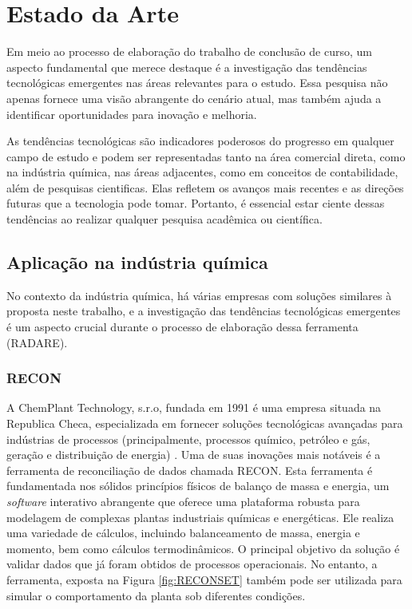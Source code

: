 \section{Estado da Arte}

Em meio ao processo de elaboração do trabalho de conclusão de curso, um aspecto fundamental que merece destaque é a investigação das tendências tecnológicas emergentes nas áreas relevantes para o estudo. Essa pesquisa não apenas fornece uma visão abrangente do cenário atual, mas também ajuda a identificar oportunidades para inovação e melhoria.

As tendências tecnológicas são indicadores poderosos do progresso em qualquer campo de estudo e podem ser representadas tanto na área comercial direta, como na indústria química, nas áreas adjacentes, como em conceitos de contabilidade, além de pesquisas cientificas. Elas refletem os avanços mais recentes e as direções futuras que a tecnologia pode tomar. Portanto, é essencial estar ciente dessas tendências ao realizar qualquer pesquisa acadêmica ou científica.

\subsection{Aplicação na indústria química}

No contexto da indústria química, há várias empresas com soluções similares à proposta neste trabalho, e a investigação das tendências tecnológicas emergentes é um aspecto crucial durante o processo de elaboração dessa ferramenta (RADARE). 

\subsubsection{RECON}

A ChemPlant Technology, s.r.o, fundada em 1991 é uma empresa situada na Republica Checa, especializada em fornecer soluções tecnológicas avançadas para indústrias de processos (principalmente, processos químico, petróleo e gás, geração e distribuição de energia) \cite{reconset}. Uma de suas inovações mais notáveis é a ferramenta de reconciliação de dados chamada RECON. Esta ferramenta é fundamentada nos sólidos princípios físicos de balanço de massa e energia, um \textit{software} interativo abrangente que oferece uma plataforma robusta para modelagem de complexas plantas industriais químicas e energéticas. Ele realiza uma variedade de cálculos, incluindo balanceamento de massa, energia e momento, bem como cálculos termodinâmicos. O principal objetivo da solução é validar dados que já foram obtidos de processos operacionais. No entanto, a ferramenta, exposta na Figura \ref{fig:RECONSET} também pode ser utilizada para simular o comportamento da planta sob diferentes condições.

